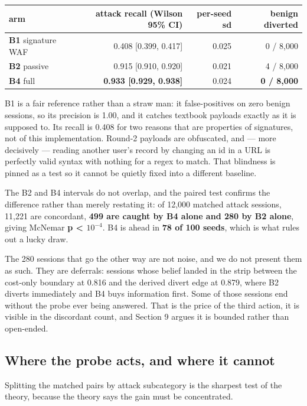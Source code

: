 \begin{table}[t]
\centering
\small
\begin{tabular}{lrrr}
\toprule
arm & attack recall (Wilson 95\% CI) & per-seed sd & benign diverted \\
\midrule
\textbf{B1} signature WAF & 0.408 [0.399, 0.417] & 0.025 & 0 / 8,000 \\
\textbf{B2} passive & 0.915 [0.910, 0.920] & 0.021 & 4 / 8,000 \\
\textbf{B4} full & \textbf{0.933 [0.929, 0.938]} & 0.024 & \textbf{0 / 8,000} \\
\bottomrule
\end{tabular}
\end{table}


B1 is a fair reference rather than a straw man: it false-positives on zero benign
sessions, so its precision is 1.00, and it catches textbook payloads exactly as it
is supposed to. Its recall is 0.408 for two reasons that are properties of
signatures, not of this implementation. Round-2 payloads are obfuscated, and ---
more decisively --- reading another user's record by changing an id in a URL is
perfectly valid syntax with nothing for a regex to match. That blindness is pinned
as a test so it cannot be
quietly fixed into a different baseline.

The B2 and B4 intervals do not overlap, and the paired test confirms the difference
rather than merely restating it: of 12,000 matched attack sessions, 11,221 are
concordant, \textbf{499 are caught by B4 alone and 280 by B2 alone}, giving McNemar
\textbf{p < $10^{-4}$}. B4 is ahead in \textbf{78 of 100 seeds}, which is what rules out a lucky
draw.

The 280 sessions that go the other way are not noise, and we do not present them as
such. They are deferrals: sessions whose belief landed in the strip between the
cost-only boundary at 0.816 and the derived divert edge at 0.879, where B2 diverts
immediately and B4 buys information first. Some of those sessions end without the
probe ever being answered. That is the price of the third action, it is visible in
the discordant count, and Section 9 argues it is bounded rather than open-ended.


\subsection{Where the probe acts, and where it cannot}

Splitting the matched pairs by attack subcategory is the sharpest test of the
theory, because the theory says the gain must be concentrated.

